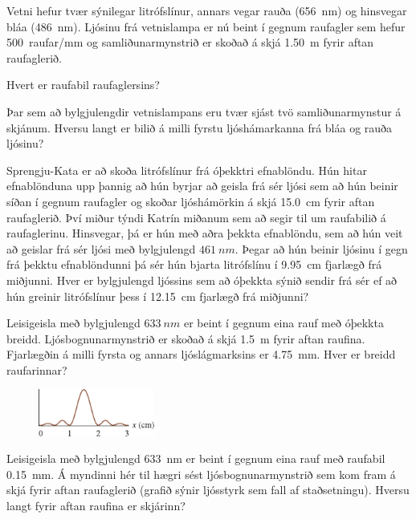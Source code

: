 \ifdefined \wholebook \else\documentclass[oneside]{book}\usepackage{EdlBook}\graphicspath{{figures/}}
\begin{document}
\begin{enumerate}[label = \textbf{(\alph*)}]

\item[\textbf{(33.13)}] Vetni hefur tvær sýnilegar litrófslínur, annars vegar rauða (\SI{656}{nm}) og hinsvegar bláa (\SI{486}{nm}). Ljósinu frá vetnislampa er nú beint í gegnum raufagler sem hefur \SI{500}{raufar/mm} og samliðunarmynstrið er skoðað á skjá \SI{1.50}{m} fyrir aftan raufaglerið. \begin{enumerate*}[label = \textbf{(\alph*)}]
    \item Hvert er raufabil raufaglersins?
    \item Þar sem að bylgjulengdir vetnislampans eru tvær sjást tvö samliðunarmynstur á skjánum. Hversu langt er bilið á milli fyrstu ljóshámarkanna frá bláa og rauða ljósinu?
\end{enumerate*}

\item[\textbf{(33.46)}] Sprengju-Kata er að skoða litrófslínur frá óþekktri efnablöndu. Hún hitar efnablönduna upp þannig að hún byrjar að geisla frá sér ljósi sem að hún beinir síðan í gegnum raufagler og skoðar ljóshámörkin á skjá \SI{15.0}{cm} fyrir aftan raufaglerið. Því miður týndi Katrín miðanum sem að segir til um raufabilið á raufaglerinu. Hinsvegar, þá er hún með aðra þekkta efnablöndu, sem að hún veit að geislar frá sér ljósi með bylgjulengd $\SI{461}{nm}$. Þegar að hún beinir ljósinu í gegn frá þekktu efnablöndunni þá sér hún bjarta litrófslínu í \SI{9.95}{cm} fjarlægð frá miðjunni. Hver er bylgjulengd ljóssins sem að óþekkta sýnið sendir frá sér ef að hún greinir litrófslínur þess í \SI{12.15}{cm} fjarlægð frá miðjunni?

\item[\textbf{(33.16)}] Leisigeisla með bylgjulengd $\SI{633}{nm}$ er beint í gegnum eina rauf með óþekkta breidd. Ljósbognunarmynstrið er skoðað á skjá \SI{1.5}{m} fyrir aftan raufina. Fjarlægðin á milli fyrsta og annars ljóslágmarksins er \SI{4.75}{mm}. Hver er breidd raufarinnar?

\begin{minipage}{\linewidth}
\begin{figure}
\vspace{-0.5cm}
\includegraphics[width = 1.5in]{figures/rk3318.pdf}
\end{figure}

\item[\textbf{(33.17)}] Leisigeisla með bylgjulengd \SI{633}{nm} er beint í gegnum eina rauf með raufabil \SI{0.15}{mm}. Á myndinni hér til hægri sést ljósbognunarmynstrið sem kom fram á skjá fyrir aftan raufaglerið (grafið sýnir ljósstyrk sem fall af staðsetningu). Hversu langt fyrir aftan raufina er skjárinn?

\end{minipage}

\end{enumerate}
\end{document}

